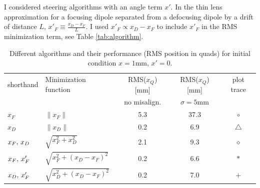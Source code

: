 I considered steering algorithms with an angle term $x'$. In the thin lens approximation for a focusing dipole separated from a defocusing dipole by a drift of distance $L$, $x'_F \equiv \frac{x_D-x_F}{L}$. I used $x'_F \propto x_D-x_F$ to include $x'_F$ in the RMS minimization term, see Table \ref{tab:algorithm}.

\begin{table}[h]
\centering
\caption{Different algorithms and their performance (RMS position in quads) for initial condition $x=1$mm, $x'=0$. }
\label{tab:steeringalgorithm}
\begin{tabular}{|l|l|c|c|c|}
\hline
shorthand & Minimization function & RMS($x_Q$) [mm] & RMS($x_Q$) [mm]  & plot trace \\
& & no misalign. & $\sigma=5$mm & \\
\hline
$x_F$ & $\| x_F \|$ & 5.3 & 37.3 & {\color{blue} $\circ$} \\
$x_D$ & $\| x_D \|$ & 0.2 & 6.9 & {\color{red} $\triangle$} \\
$x_F,\thinspace x_D$ & $\sqrt{x_F^2+x_D^2}$ &  2.1 & 9.3 & {\color{cyan} $\diamond$} \\
$x_F,\thinspace x'_F$ & $\sqrt{x_F^2+(x_D-x_F)^2}$ & 0.2 & 6.6 & $\ast$ \\
$x_D,\thinspace x'_F$ & $\sqrt{x_D^2+(x_D-x_F)^2}$  & 0.2 & 7.0 & {\color{magenta} $+$} \\
\hline
\end{tabular}
\end{table}




